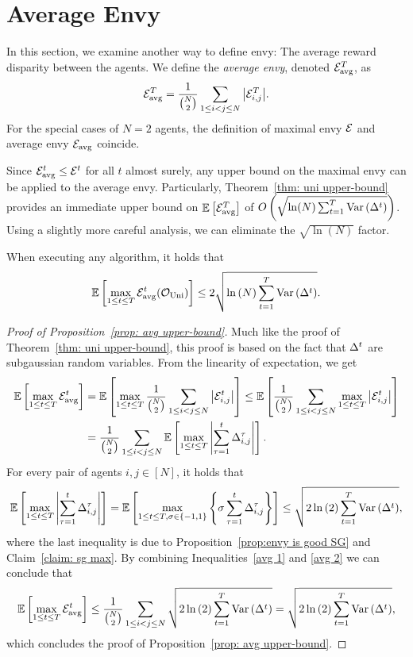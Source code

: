 \section{Average Envy}
\label{sec: avg envy}
In this section, we examine another way to define envy: The average reward disparity between the agents. We define the \emph{average envy}, denoted $\mathcal{E}_{\textnormal{avg}}^T$, as 
\[
\mathcal{E}_{\textnormal{avg}}^T = \frac{1}{\binom{N}{2}}\sum_{1\leq i<j\leq N}{\left\lvert\mathcal{E}_{i,j}^T\right\rvert}.
\]
For the special cases of $N=2$ agents, the definition of maximal envy $\mathcal{E}$ and average envy $\mathcal{E}_{\textnormal{avg}}$ coincide. 


Since $\mathcal{E}_{\textnormal{avg}}^t \leq \mathcal{E}^t$ for all $t$  almost surely, any upper bound on the maximal envy can be applied to the average envy. Particularly, Theorem~\ref{thm: uni upper-bound} provides an immediate upper bound on $\mathbb{E}\left[ \mathcal{E}_{\textnormal{avg}}^T \right]$ of $O\left(\sqrt{\ln (N) \sum^T_{t=1} \mathrm{Var}\left( {\Delta^t} \right)} \right)$. Using a slightly more careful analysis, we can eliminate the $\sqrt{\ln{(N)}}$ factor.
\begin{proposition}\label{prop: avg upper-bound}
When executing any algorithm, it holds that
\[\mathbb{E}\left[ \max_{1\leq t \leq T} \mathcal{E}_{\textnormal{avg}}^t (\mathcal O_{\textnormal{Uni}}) \right] \leq 2\sqrt{\ln{(N)} \sum^{T}_{t=1}{\mathrm{Var}\left( {\Delta^t} \right)} }.\]
\end{proposition}
\begin{proof}[Proof of Proposition~\ref{prop: avg upper-bound}]
Much like the proof of Theorem~\ref{thm: uni upper-bound}, this proof is based on the fact that ${\Delta^t}$ are subgaussian random variables. From the linearity of expectation, we get
\begin{align}\label{avg 1}
\mathbb{E}\left[ \max_{1\leq t \leq T} \mathcal{E}_{\textnormal{avg}}^t  \right] &=
\mathbb{E}\left[ \max_{1\leq t \leq T} \frac{1}{\binom{N}{2}}\sum_{1\leq i<j\leq N}{\left\lvert\mathcal{E}_{i,j}^t\right\rvert} \right] 
\leq \mathbb{E}\left[ \frac{1}{\binom{N}{2}}\sum_{1\leq i<j\leq N}{\max_{1\leq t \leq T} 
 \left\lvert\mathcal{E}_{i,j}^t\right\rvert} \right] \nonumber\\
&=\frac{1}{\binom{N}{2}}\sum_{1\leq i<j\leq N}\mathbb{E}\left[ \max_{1\leq t \leq T}  \left\lvert\sum^t_{\tau=1}{\Delta_{i,j}^\tau}\right\rvert  \right].
\end{align}
For every pair of agents $i,j \in [N]$, it holds that
\begin{align}\label{avg 2}
\mathbb{E}\left[ \max_{1\leq t \leq T}  \left\lvert\sum^t_{\tau=1}{\Delta_{i,j}^\tau}\right\rvert  \right] =
\mathbb{E}\left[ \max_{1\leq t \leq T, \sigma\in \{-1,1\}}\left\{\sigma\sum^t_{\tau=1}{\Delta_{i,j}^\tau}\right\} \right] \leq
\sqrt{2\ln{(2)}\sum^T_{t=1}{\mathrm{Var}\left( {\Delta^t} \right)}},
\end{align}
where the last inequality is due to Proposition~\ref{prop:envy is good SG} and Claim~\ref{claim: sg max}. By combining Inequalities~\eqref{avg 1} and \eqref{avg 2} we can conclude that
\begin{align*}
\mathbb{E}\left[ \max_{1\leq t \leq T} \mathcal{E}_{\textnormal{avg}}^t  \right] \leq
\frac{1}{\binom{N}{2}}\sum_{1\leq i<j\leq N}{\sqrt{2\ln{(2)}\sum^T_{t=1}{\mathrm{Var}\left( {\Delta^t} \right)}}} =
\sqrt{2\ln{(2)}\sum^T_{t=1}{\mathrm{Var}\left( {\Delta^t} \right)}},
\end{align*}
which concludes the proof of Proposition~\ref{prop: avg upper-bound}. 
\end{proof}
